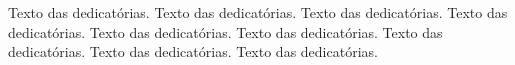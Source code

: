 
\begin{dedicatoria}
Texto das dedicatórias. Texto das dedicatórias. Texto das dedicatórias. Texto das dedicatórias. Texto das dedicatórias. Texto das dedicatórias. Texto das dedicatórias. Texto das dedicatórias. Texto das dedicatórias.
\end{dedicatoria}